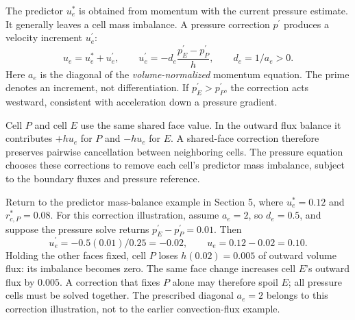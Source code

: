 \newpage
{}
The predictor $u_e^*$ is obtained from momentum with the current pressure
estimate. It generally leaves a cell mass imbalance. A pressure correction
$p^\prime$ produces a velocity increment $u_e^\prime$:
\[
u_e=u_e^*+u_e^\prime,\qquad
u_e^\prime=-d_e\frac{p_E^\prime-p_P^\prime}{h},\qquad d_e=1/a_e>0.
\]
Here $a_e$ is the diagonal of the \emph{volume-normalized} momentum equation.
The prime denotes an increment, not differentiation. If $p_E^\prime>p_P^\prime$,
the correction acts westward, consistent with acceleration down a pressure
gradient.

Cell $P$ and cell $E$ use the same shared face value. In the outward flux
balance it contributes $+h u_e$ for $P$ and $-h u_e$ for $E$. A shared-face
correction therefore preserves pairwise cancellation between neighboring cells.
The pressure equation chooses these corrections to remove each cell's
predictor mass imbalance, subject to the boundary fluxes and pressure reference.

Return to the predictor mass-balance example in Section 5, where $u_e^*=0.12$ and
$r_{c,P}^*=0.08$. For this correction illustration, assume $a_e=2$, so
$d_e=0.5$, and suppose the pressure solve returns
$p_E^\prime-p_P^\prime=0.01$. Then
\[
u_e^\prime=-0.5(0.01)/0.25=-0.02,\qquad u_e=0.12-0.02=0.10.
\]
Holding the other faces fixed, cell $P$ loses $h(0.02)=0.005$ of outward
volume flux: its imbalance becomes zero. The same face change increases
cell $E$'s outward flux by $0.005$. A correction that fixes $P$ alone may
therefore spoil $E$; all pressure cells must be solved together.
The prescribed diagonal $a_e=2$ belongs to this correction illustration,
not to the earlier convection-flux example.
